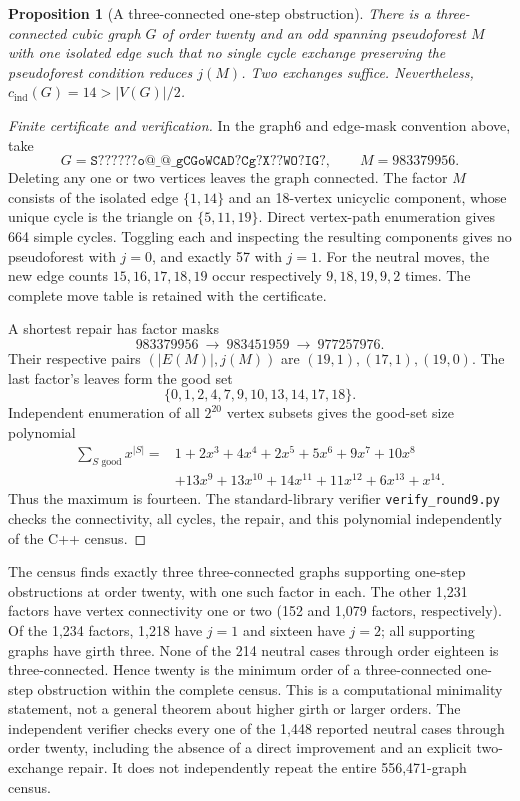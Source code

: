 \documentclass[11pt]{article}
\newtheorem{proposition}[theorem]{Proposition}
\newcommand{\cind}{c_{\mathrm{ind}}}
\begin{document}
\begin{proposition}[A three-connected one-step obstruction]\label{prop:three-connected-trap}
There is a three-connected cubic graph $G$ of order twenty and an
odd spanning pseudoforest $M$ with one isolated edge such that no
single cycle exchange preserving the pseudoforest condition
reduces $j(M)$. Two exchanges suffice. Nevertheless,
$\cind(G)=14> |V(G)|/2$.
\end{proposition}
\begin{proof}[Finite certificate and verification]
In the graph6 and edge-mask convention above, take
\[
 G=\texttt{S??????o@\_@\_gCGoWCAD?Cg?X??WO?IG?},\qquad
 M=983379956.
\]
Deleting any one or two vertices leaves the graph connected.
The factor $M$ consists of the isolated edge $\{1,14\}$ and an
18-vertex unicyclic component, whose unique cycle is the triangle
on $\{5,11,19\}$. Direct vertex-path enumeration gives 664 simple
cycles. Toggling each and inspecting the resulting components
gives no pseudoforest with $j=0$, and exactly 57 with $j=1$.
For the neutral moves, the new edge counts $15,16,17,18,19$ occur
respectively $9,18,19,9,2$ times. The complete move table is retained
with the certificate.

A shortest repair has factor masks
\[
 983379956\ \longrightarrow\ 983451959\
 \longrightarrow\ 977257976.
\]
Their respective pairs $(|E(M)|,j(M))$ are $(19,1),(17,1),(19,0)$.
The last factor's leaves form the good set
\[
 \{0,1,2,4,7,9,10,13,14,17,18\}.
\]
Independent enumeration of all $2^{20}$ vertex subsets gives the
good-set size polynomial
\begin{align*}
 \sum_{S\text{ good}}x^{|S|}
 ={}&1+2x^3+4x^4+2x^5+5x^6+9x^7+10x^8\\
 &+13x^9+13x^{10}+14x^{11}+11x^{12}+6x^{13}+x^{14}.
\end{align*}
Thus the maximum is fourteen. The standard-library verifier
\texttt{verify\_round9.py} checks the connectivity, all cycles,
the repair, and this polynomial independently of the C++ census.
\end{proof}

The census finds exactly three three-connected graphs supporting
one-step obstructions at order twenty, with one such factor in each.
The other 1,231 factors have vertex connectivity one or two
(152 and 1,079 factors, respectively). Of the 1,234 factors, 1,218
have $j=1$ and sixteen have $j=2$; all supporting graphs have
girth three. None of the 214 neutral
cases through order eighteen is three-connected. Hence twenty is
the minimum order of a three-connected one-step obstruction within
the complete census. This is a computational minimality statement,
not a general theorem about higher girth or larger orders.
The independent verifier checks every one of the 1,448 reported
neutral cases through order twenty, including the absence of a
direct improvement and an explicit two-exchange repair. It does
not independently repeat the entire 556,471-graph census.
\end{document}
